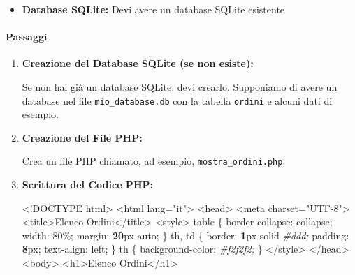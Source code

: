 \documentclass[
]{article}
\newenvironment{Shaded}{}{}
\newcommand{\CommentTok}[1]{\textcolor[rgb]{0.38,0.63,0.69}{\textit{#1}}}
\newcommand{\ConstantTok}[1]{\textcolor[rgb]{0.53,0.00,0.00}{#1}}
\newcommand{\DecValTok}[1]{\textcolor[rgb]{0.25,0.63,0.44}{#1}}
\newcommand{\ErrorTok}[1]{\textcolor[rgb]{1.00,0.00,0.00}{\textbf{#1}}}
\newcommand{\NormalTok}[1]{#1}
\newcommand{\OperatorTok}[1]{\textcolor[rgb]{0.40,0.40,0.40}{#1}}
\newcommand{\OtherTok}[1]{\textcolor[rgb]{0.00,0.44,0.13}{#1}}
\newcommand{\StringTok}[1]{\textcolor[rgb]{0.25,0.44,0.63}{#1}}
\providecommand{\tightlist}{%
  \setlength{\itemsep}{0pt}\setlength{\parskip}{0pt}}
\begin{document}
\begin{itemize}
\tightlist
\item
  \textbf{Database SQLite:} Devi avere un database SQLite esistente
\end{itemize}

\paragraph{Passaggi}\label{passaggi}

\begin{enumerate}
\def\labelenumi{\arabic{enumi}.}
\item
  \textbf{Creazione del Database SQLite (se non esiste):}

  Se non hai già un database SQLite, devi crearlo. Supponiamo di avere
  un database nel file \texttt{mio\_database.db} con la tabella
  \texttt{ordini} e alcuni dati di esempio.
\item
  \textbf{Creazione del File PHP:}

  Crea un file PHP chiamato, ad esempio, \texttt{mostra\_ordini.php}.
\item
  \textbf{Scrittura del Codice PHP:}

\begin{Shaded}
\begin{Highlighting}[]
\OperatorTok{\textless{}!}\ConstantTok{DOCTYPE}\NormalTok{ html}\OperatorTok{\textgreater{}}
\OperatorTok{\textless{}}\NormalTok{html lang}\OperatorTok{=}\StringTok{"it"}\OperatorTok{\textgreater{}}
\OperatorTok{\textless{}}\NormalTok{head}\OperatorTok{\textgreater{}}
    \OperatorTok{\textless{}}\NormalTok{meta charset}\OperatorTok{=}\StringTok{"UTF{-}8"}\OperatorTok{\textgreater{}}
    \OperatorTok{\textless{}}\NormalTok{title}\OperatorTok{\textgreater{}}\NormalTok{Elenco Ordini}\OperatorTok{\textless{}/}\NormalTok{title}\OperatorTok{\textgreater{}}
    \OperatorTok{\textless{}}\NormalTok{style}\OperatorTok{\textgreater{}}
\NormalTok{        table \{}
\NormalTok{            border}\OperatorTok{{-}}\NormalTok{collapse}\OtherTok{:}\NormalTok{ collapse}\OtherTok{;}
\NormalTok{            width}\OtherTok{:} \DecValTok{80}\OperatorTok{\%}\OtherTok{;}
\NormalTok{            margin}\OtherTok{:} \ErrorTok{20}\NormalTok{px auto}\OtherTok{;}
\NormalTok{        \}}
\NormalTok{        th}\OtherTok{,}\NormalTok{ td \{}
\NormalTok{            border}\OtherTok{:} \ErrorTok{1}\NormalTok{px solid }\CommentTok{\#ddd;}
\NormalTok{            padding}\OtherTok{:} \ErrorTok{8}\NormalTok{px}\OtherTok{;}
\NormalTok{            text}\OperatorTok{{-}}\NormalTok{align}\OtherTok{:}\NormalTok{ left}\OtherTok{;}
\NormalTok{        \}}
\NormalTok{        th \{}
\NormalTok{            background}\OperatorTok{{-}}\NormalTok{color}\OtherTok{:} \CommentTok{\#f2f2f2;}
\NormalTok{        \}}
    \OperatorTok{\textless{}/}\NormalTok{style}\OperatorTok{\textgreater{}}
\OperatorTok{\textless{}/}\NormalTok{head}\OperatorTok{\textgreater{}}
\OperatorTok{\textless{}}\NormalTok{body}\OperatorTok{\textgreater{}}
    \OperatorTok{\textless{}}\NormalTok{h1}\OperatorTok{\textgreater{}}\NormalTok{Elenco Ordini}\OperatorTok{\textless{}/}\NormalTok{h1}\OperatorTok{\textgreater{}}


\end{Highlighting}
\end{Shaded}
\end{enumerate}
\end{document}

